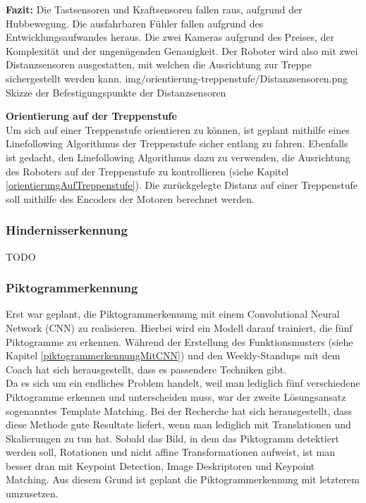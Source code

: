 \textbf{Fazit:} Die Tastsensoren und Kraftsensoren fallen raus, aufgrund der Hubbewegung. Die ausfahrbaren Fühler fallen aufgrund des Entwicklungsaufwandes heraus. Die zwei Kameras aufgrund des Preises, der Komplexität und der ungenügenden Genauigkeit. Der Roboter wird also mit zwei Distanzsensoren ausgestatten, mit welchen die Ausrichtung zur Treppe sichergestellt werden kann.
\image
   {img/orientierung-treppenstufe/Distanzsensoren.png}
   {Skizze der Befestigungspunkte der Distanzsensoren}


\textbf{Orientierung auf der Treppenstufe}\\
Um sich auf einer Treppenstufe orientieren zu können, ist geplant mithilfe eines Linefollowing Algorithmus der Treppenstufe sicher entlang zu fahren. Ebenfalls ist gedacht, den Linefollowing Algorithmus dazu zu verwenden, die Ausrichtung des Roboters auf der Treppenstufe zu kontrollieren (siehe Kapitel \ref{orientierungAufTreppenstufe}).
Die zurückgelegte Distanz auf einer Treppenstufe soll mithilfe des Encoders der Motoren berechnet werden.

\subsubsection{Hindernisserkennung}
TODO
\subsubsection{Piktogrammerkennung}
Erst war geplant, die Piktogrammerkennung mit einem Convolutional Neural Network (CNN) zu realisieren. Hierbei wird ein Modell darauf trainiert, die fünf Piktogramme zu erkennen. Während der Erstellung des Funktionsmusters (siehe Kapitel \ref{piktogrammerkennungMitCNN}) und den Weekly-Standups mit dem Coach hat sich herausgestellt, dass es passendere Techniken gibt.\\
Da es sich um ein endliches Problem handelt, weil man lediglich fünf verschiedene Piktogramme erkennen und unterscheiden muss, war der zweite Lösungsansatz sogenanntes Template Matching\cite{OpenCV-Template-Matching}. Bei der Recherche hat sich herausgestellt, dass diese Methode gute Resultate liefert, wenn man lediglich mit Translationen und Skalierungen zu tun hat. Sobald das Bild, in dem das Piktogramm detektiert werden soll, Rotationen und nicht affine Transformationen aufweist, ist man besser dran mit Keypoint Detection, Image Deskriptoren und Keypoint Matching\cite{OpenCV-Feature-Matching}. Aus diesem Grund ist geplant die Piktogrammerkennung mit letzterem umzusetzen.




